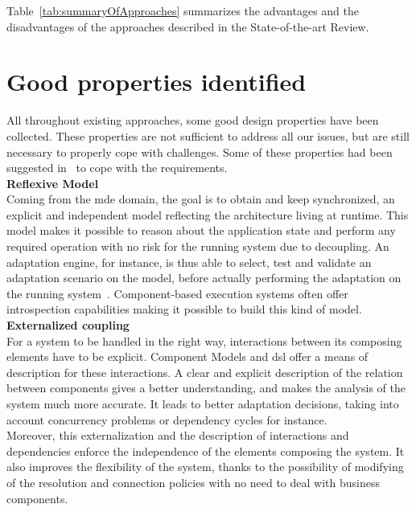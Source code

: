 Table~\ref{tab:summaryOfApproaches} summarizes the advantages and the disadvantages of the approaches described in the State-of-the-art Review.\\


\section{Good properties identified}

All throughout existing approaches, some good design properties have been collected. These properties are not sufficient to address all our issues, but are still necessary to properly cope with challenges. Some of these properties had been suggested in~\cite{Nain09a} to cope with the requirements.\\

{\bf Reflexive Model}\\
Coming from the \gls{mde} domain, the goal is to obtain and keep synchronized, an explicit and independent model reflecting the architecture living at runtime. This model makes it possible to reason about the application state and perform any required operation with no risk for the running system due to decoupling. An adaptation engine, for instance, is thus able to select, test and validate an adaptation scenario on the model, before actually performing the adaptation on the running system~\cite{Leger:2007}.
Component-based execution systems often offer introspection capabilities making it possible to build this kind of model.\\

{\bf Externalized coupling}\\
For a system to be handled in the right way, interactions between its composing elements have to be explicit. Component Models and \gls{dsl} offer a means of description for these interactions. A clear and explicit description of the relation between components gives a better understanding, and makes the analysis of the system much more accurate. It leads to better adaptation decisions, taking into account concurrency problems or dependency cycles for instance.\\
Moreover, this externalization and the description of interactions and dependencies enforce the independence of the elements composing the system. It also improves the flexibility of the system, thanks to the possibility of modifying of the resolution and connection policies with no need to deal with business components.\\

